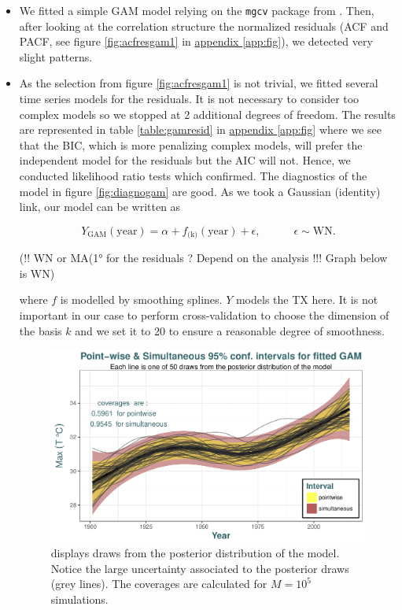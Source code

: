 \documentclass[11pt,a4paper,openany ]{book}
\begin{document}
\begin{itemize}
\item We fitted a simple GAM model relying on the \texttt{mgcv} package from \citet{maindonald_data_2006}. Then, after looking at the correlation structure the normalized residuals (ACF and PACF, see figure \ref{fig:acfresgam1} in \hyperref[app:fig]{appendix \ref{app:fig}}), we detected very slight patterns.

\item As the selection from figure \ref{fig:acfresgam1} is not trivial, we fitted several time series models for the residuals. It is not necessary to consider too complex models so we stopped at 2 additional degrees of freedom. The results are represented in table \ref{table:gamresid} in \hyperref[app:fig]{appendix \ref{app:fig}} where we see that the BIC, which is more penalizing complex models, will prefer the independent model for the residuals but the AIC will not. Hence, we conducted likelihood ratio tests which confirmed. The diagnostics of the model in figure \ref{fig:diagnogam} are good. As we took a Gaussian (identity) link, our model can be written as

\begin{equation}\label{eq:gam}
Y_{\text{GAM}}(\text{year}) = \alpha + f_{\text{(k)}}(\text{year})+\epsilon , \qquad\quad \epsilon\sim\text{WN}.
\end{equation}

(!! WN or MA(1° for the residuals ? Depend on the analysis !!! Graph below is WN)


where $f$ is modelled by smoothing splines. $Y$ models the TX here. It is not important in our case to perform cross-validation to choose the dimension of the basis $k$ and we set it to 20 to ensure a reasonable degree of smoothness.

\begin{figure}[!htb]
\centering	\includegraphics[width=.75\linewidth]{post_draws.pdf}\caption{displays draws from the posterior distribution of the model. Notice the large uncertainty associated to the posterior draws (grey lines).  The coverages are calculated for $M=10^5$ simulations. }\label{fig:post_draws}
\end{figure}


\end{itemize}
\end{document}
